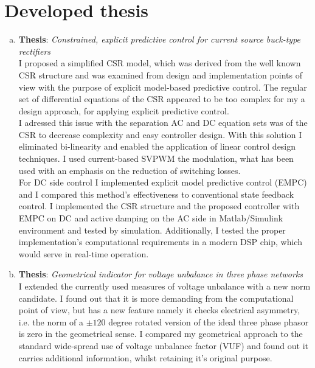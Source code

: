 \section{Developed thesis}

\begin{enumerate}[a.)]
\item\textbf{Thesis}: \emph{Constrained, explicit predictive control for current source buck-type rectifiers}\\
    I proposed a simplified CSR model, which was derived from the well known CSR structure and was examined from design and implementation points of view with the purpose of explicit model-based predictive control. The regular set of differential equations of the CSR appeared to be too complex for my a design approach, for applying explicit predictive control. \\
		I adressed this issue with the separation AC and DC equation sets was of the CSR to decrease complexity and easy controller design. With this solution I eliminated bi-linearity and enabled the application of linear control design techniques. I used current-based SVPWM the modulation, what has been used with an emphasis on the reduction of switching losses. \\
		For DC side control I implemented explicit model predictive control (EMPC) and I compared this method's effectiveness to conventional state feedback control. I implemented the CSR structure and the proposed controller with EMPC on DC and active damping on the AC side in Matlab/Simulink environment and tested by simulation. Additionally, I tested the proper implementation's computational requirements in a modern DSP chip, which would serve in real-time operation.\\
		
\item\textbf{Thesis}: \emph{Geometrical indicator for voltage unbalance in three phase networks}\\
    I extended the currently used measures of voltage unbalance with a new norm candidate. I found out that it is more demanding from the computational point of view, but has a new feature namely it checks electrical asymmetry, i.e. the norm of a $\pm120$ degree rotated version of the ideal three phase phasor is zero in the geometrical sense. I compared my geometrical approach to the standard wide-spread use of voltage unbalance factor (VUF) and found out it carries additional information, whilst retaining it's original purpose.\\
		

\end{enumerate}
